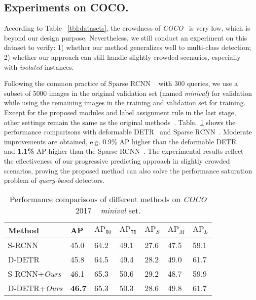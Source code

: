 \documentclass[final]{cvpr}
\begin{document}
\vspace{-0.2cm}
\subsection{Experiments on COCO.}
According to Table ~\ref{tbl:datasets}, the crowdness of \emph{COCO}~\cite{lin2014microsoft} is
very low, which is beyond our design purpose. Nevertheless, we still conduct an experiment on this dataset to verify: 1) whether our method generalizes well to multi-class detection; 2) whether our approach can still handle slightly crowded scenarios, especially with \emph{isolated} instances.

Following the common practice of Sparse RCNN ~\cite{sun2020sparse} with 300 queries, we use a subset of 5000 images in the original validation set (named \emph{minival}) for validation while using the remaining images in the training and validation set for training. Except for the proposed modules and label assignment rule in the last stage, other settings remain the same as the original methods~\cite{zhu2021deformable, sun2020sparse}. Table.~\ref{tbl:mscoco_eval} shows the performance comparisons with deformable DETR~\cite{zhu2021deformable} and Sparse RCNN~\cite{sun2020sparse}. Moderate improvements are obtained, e.g. \textbf{}{0.9\%} $\text{AP}$ higher than the deformable DETR~\cite{zhu2021deformable} and \textbf{1.1\%} $\text{AP}$ higher than the Sparse RCNN~\cite{sun2020sparse}. The experimental results reflect the effectiveness of our progressive predicting approach in slightly crowded scenarios, proving the proposed method can also solve the performance saturation problem of \emph{query-based} detectors.

\begin{table}[t]
  \centering
  \begin{tabular}{p{23mm}|p{5mm}<{\centering}p{5mm}<{\centering}p{6mm}<{\centering}|p{5mm}<{\centering}p{5mm}<{\centering}p{5mm}<{\centering}}
  \toprule
  Method & AP & $\text{AP}_{50}$ & $\text{AP}_{75}$ &  $\text{AP}_{S}$ & $\text{AP}_{M}$  & $\text{AP}_{L}$\\
  \hline
  S-RCNN~\cite{sun2020sparse} & 45.0 & 64.2 & 49.1 & 27.6 & 47.5 & 59.1 \\
  D-DETR~\cite{zhu2021deformable} & 45.8 & 64.5 & 49.4 & 28.2 & 49.0 & 61.7 \\
  \hline
  S-RCNN+\emph{Ours} & 46.1 & 65.3 & 50.6 & 29.2  &  48.7  & 59.9 \\
  D-DETR+\emph{Ours} &  \textbf{46.7} & 65.3 & 50.3 & 28.6  &  49.8  & 61.7 \\
  \bottomrule
  \end{tabular}
  \caption{Performance comparisons of different methods on \emph{COCO} 2017 ~\cite{lin2014microsoft} \emph{minival} set.}
  \label{tbl:mscoco_eval}
 \vspace{-1pt}
\end{table}
\end{document}
